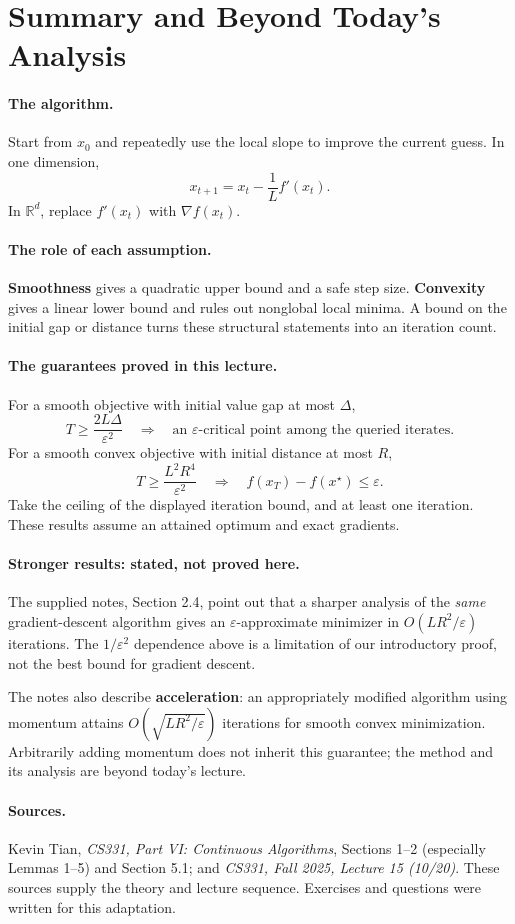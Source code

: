 \documentclass[11pt,letterpaper]{article}
\theoremstyle{definition}
\theoremstyle{plain}
\newcounter{question}
\newcommand{\R}{\mathbb R}
\newcommand{\eps}{\varepsilon}
\newcommand{\xstar}{x^\star}
\begin{document}
\newpage
\section{Summary and Beyond Today's Analysis}

\paragraph{The algorithm.}
Start from $x_0$ and repeatedly use the local slope to improve the current
guess. In one dimension,
\[
  x_{t+1}=x_t-\frac1L f'(x_t).
\]
In $\R^d$, replace $f'(x_t)$ with $\nabla f(x_t)$.

\paragraph{The role of each assumption.}
\textbf{Smoothness} gives a quadratic upper bound and a safe step size.
\textbf{Convexity} gives a linear lower bound and rules out nonglobal local
minima. A bound on the initial gap or distance turns these structural
statements into an iteration count.

\paragraph{The guarantees proved in this lecture.}
For a smooth objective with initial value gap at most $\Delta$,
\[
  T\geq\frac{2L\Delta}{\eps^2}
  \quad\Longrightarrow\quad
  \text{an $\eps$-critical point among the queried iterates}.
\]
For a smooth convex objective with initial distance at most $R$,
\[
  T\geq\frac{L^2R^4}{\eps^2}
  \quad\Longrightarrow\quad
  f(x_T)-f(\xstar)\leq\eps.
\]
Take the ceiling of the displayed iteration bound, and at least one
iteration. These results assume an attained optimum and exact gradients.

\paragraph{Stronger results: stated, not proved here.}
The supplied notes, Section 2.4, point out that a sharper analysis of the
\emph{same} gradient-descent algorithm gives an $\eps$-approximate minimizer
in $O(LR^2/\eps)$ iterations. The $1/\eps^2$ dependence above is a limitation
of our introductory proof, not the best bound for gradient descent.

The notes also describe \textbf{acceleration}: an appropriately modified
algorithm using momentum attains $O(\sqrt{LR^2/\eps})$ iterations for smooth
convex minimization. Arbitrarily adding momentum does not inherit this
guarantee; the method and its analysis are beyond today's lecture.

\paragraph{Sources.}
Kevin Tian, \emph{CS331, Part VI: Continuous Algorithms}, Sections 1--2
(especially Lemmas 1--5) and Section 5.1; and \emph{CS331, Fall 2025,
Lecture 15 (10/20)}. These sources supply the theory and lecture sequence.
Exercises and questions were written for this adaptation.
\end{document}
